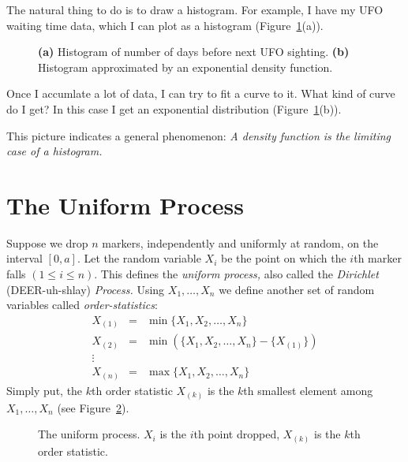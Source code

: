 The natural thing to do is to draw a histogram. 
For example, I have my UFO waiting time data, which I can plot as a
histogram (Figure~\ref{fig:ufo}(a)). 

\begin{figure}
\begin{center}
\mbox{}
\end{center}
\caption{{\bf (a)} Histogram of number of days before next UFO sighting.
         {\bf (b)} Histogram approximated by an exponential density function.}
\label{fig:ufo}
\end{figure}

Once I accumlate a lot of data, I can try to fit a curve to it.  
What kind of curve do I get?
In this case I get an exponential distribution (Figure~\ref{fig:ufo}(b)).  

This picture indicates a general phenomenon:  {\em A density function is
the limiting case of a histogram.}

\section{The Uniform Process}

Suppose we drop $n$ markers, independently and uniformly at random, on
the interval $[0,a]$.
Let the random variable 
$X_i$ be the point on which the $i$th marker falls $(1\leq i\leq n)$.
This defines the {\em uniform process,} also called the 
{\em Dirichlet} (DEER-uh-shlay) {\em Process.}
Using $X_1,\ldots,X_n$ we define another set of random variables called {\em
order-statistics}: 
\begin{eqnarray*}
  X_{(1)} & = & \min\{X_1,X_2,\ldots,X_n\} \\
  X_{(2)} & = & \min(\{X_1,X_2,\ldots,X_n\} - \{X_{(1)}\})\\
  \vdots & & \\
  X_{(n)} & = & \max\{X_1,X_2,\ldots,X_n\} 
\end{eqnarray*}
Simply put, the $k$th order statistic $X_{(k)}$ is the $k$th smallest
element among $X_1,\ldots,X_n$ (see Figure~\ref{fig:uniform}). 

\begin{figure}
\begin{center}
\mbox{}
\end{center}
\caption{The uniform process. $X_i$ is the $i$th point dropped, $X_{(k)}$
is the $k$th order statistic.}
\label{fig:uniform}
\end{figure}

